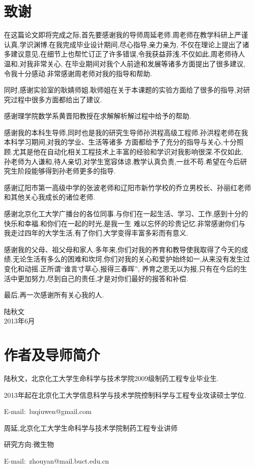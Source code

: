 \chapter*{致谢}
在这篇论文即将完成之际,首先要感谢我的导师周延老师.周老师在教学科研上严谨认真,学识渊博.在我完成毕业设计期间,尽心指导,亲力亲为,
不仅在理论上提出了诸多建议意见,在细节上也帮忙订正了许多错误,令我获益菲浅.不仅如此,周老师待人温和,对我非常关心,
在毕业期间对我个人前途和发展等诸多方面提出了很多建议,令我十分感动.非常感谢周老师对我的指导和帮助.\par
同时,感谢实验室的耿婧师姐.耿师姐在关于本课题的实验方面给了很多的指导,对研究过程中很多方面都给出了建议.\par
感谢理学院数学系黄晋阳教授在求解解析解过程中给予的帮助.\par
感谢我的本科生导师,同时也是我的研究生导师孙洪程高级工程师.孙洪程老师在我本科学习期间,对我的学业、生活等诸多
方面都给予了充分的指导与关心,十分照顾.尤其是他在自动化相关工程技术上丰富的经验和学识对我影响很深.不仅如此,
孙老师为人谦和,待人亲切,对学生宽容体谅,教学认真负责,一丝不苟.希望在今后研究生阶段能够得到孙老师更多的指导.\par
感谢辽阳市第一高级中学的张波老师和辽阳市新竹学校的乔立男校长、孙丽红老师和其他关心我成长的诸位老师.\par
感谢北京化工大学广播台的各位同事.与你们在一起生活、学习、工作,感到十分的快乐和幸福.和你们在一起的时光,是我一生
难以忘怀的珍贵记忆.非常感谢你们与我走过四年的大学生活,有了你们,大学变得丰富多彩而有意义.\par
感谢我的父母、祖父母和家人.多年来,你们对我的养育和教导使我取得了今天的成绩.无论生活有多么的困难和坎坷,你们对我的关心和爱护始终如一,从来没有发生过变化和动摇.正所谓``谁言寸草心,报得三春晖'',
养育之恩无以为报,只有在今后的生活中更加努力,尽到自己的责任,才是对你们最好的报答和补偿.\par
最后,再一次感谢所有关心我的人.
\par
\begin{flushright}
\begin{minipage}[t]{7em}
\centering\kaishu
陆秋文\\
2013年6月
\end{minipage}
\end{flushright}

\chapter*{作者及导师简介}
\noindent 陆秋文，北京化工大学生命科学与技术学院2009级制药工程专业毕业生.\par
\noindent 2013年起在北京化工大学信息科学与技术学院控制科学与工程专业攻读硕士学位.\par
\noindent E-mail:~luqiuwen@gmail.com\par

\vspace{3em}
\noindent 周延,北京化工大学生命科学与技术学院制药工程专业讲师\par
\noindent 研究方向:微生物\par
\noindent E-mail:~zhouyan@mail.buct.edu.cn